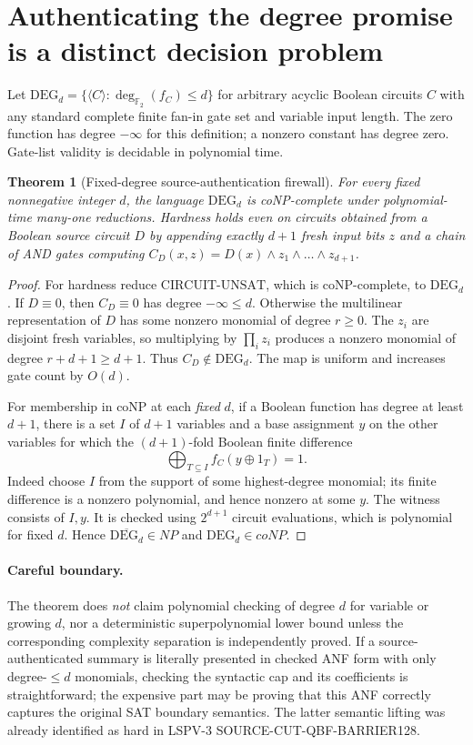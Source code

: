 \documentclass[11pt]{article}
\newtheorem{theorem}{Theorem}
\newcommand{\F}{\mathbb F_2}
\begin{document}
\section{Authenticating the degree promise is a distinct decision problem}
Let $\mathrm{DEG}_d=\{\langle C\rangle: \deg_{\F}(f_C)\le d\}$ for arbitrary acyclic Boolean circuits $C$ with any standard complete finite fan-in gate set and variable input length. The zero function has degree $-\infty$ for this definition; a nonzero constant has degree zero. Gate-list validity is decidable in polynomial time.
\begin{theorem}[Fixed-degree source-authentication firewall]\label{th:hard}
For every fixed nonnegative integer $d$, the language $\mathrm{DEG}_d$ is coNP-complete under polynomial-time many-one reductions. Hardness holds even on circuits obtained from a Boolean source circuit $D$ by appending exactly $d+1$ fresh input bits $z$ and a chain of AND gates computing $C_D(x,z)=D(x)\wedge z_1\wedge\dots\wedge z_{d+1}$.
\end{theorem}
\begin{proof}
For hardness reduce $\mathrm{CIRCUIT}\text{-}\mathrm{UNSAT}$, which is coNP-complete, to $\mathrm{DEG}_d$. If $D\equiv0$, then $C_D\equiv0$ has degree $-\infty\le d$. Otherwise the multilinear representation of $D$ has some nonzero monomial of degree $r\ge0$. The $z_i$ are disjoint fresh variables, so multiplying by $\prod_i z_i$ produces a nonzero monomial of degree $r+d+1\ge d+1$. Thus $C_D\notin\mathrm{DEG}_d$. The map is uniform and increases gate count by $O(d)$.

For membership in coNP at each \emph{fixed} $d$, if a Boolean function has degree at least $d+1$, there is a set $I$ of $d+1$ variables and a base assignment $y$ on the other variables for which the $(d+1)$-fold Boolean finite difference
\[
 \bigoplus_{T\subseteq I}f_C(y\oplus1_T)=1.
\]
Indeed choose $I$ from the support of some highest-degree monomial; its finite difference is a nonzero polynomial, and hence nonzero at some $y$. The witness consists of $I,y$. It is checked using $2^{d+1}$ circuit evaluations, which is polynomial for fixed $d$. Hence $\overline{\mathrm{DEG}_d}\in NP$ and $\mathrm{DEG}_d\in coNP$.
\end{proof}
\paragraph{Careful boundary.} The theorem does \emph{not} claim polynomial checking of degree $d$ for variable or growing $d$, nor a deterministic superpolynomial lower bound unless the corresponding complexity separation is independently proved. If a source-authenticated summary is literally presented in checked ANF form with only degree-$\le d$ monomials, checking the syntactic cap and its coefficients is straightforward; the expensive part may be proving that this ANF correctly captures the original SAT boundary semantics. The latter semantic lifting was already identified as hard in LSPV-3 SOURCE-CUT-QBF-BARRIER128.
\end{document}
